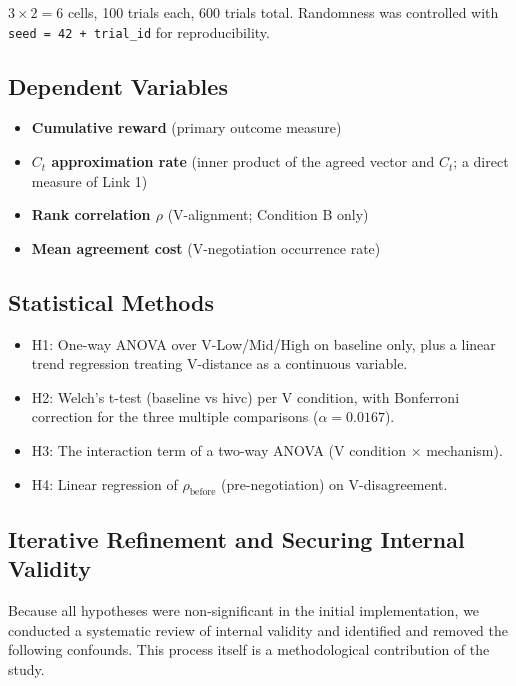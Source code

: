 \documentclass[11pt]{article}
\newcommand{\Ct}{\ensuremath{C_t}}
\begin{document}
$3\times2=6$ cells, 100 trials each, 600 trials total. Randomness was controlled with \texttt{seed = 42 + trial\_id} for reproducibility.

\subsection{Dependent Variables}

\begin{itemize}[nosep]
  \item \textbf{Cumulative reward} (primary outcome measure)
  \item \textbf{\Ct{} approximation rate} (inner product of the agreed vector and \Ct{}; a direct measure of Link 1)
  \item \textbf{Rank correlation $\rho$} (V-alignment; Condition B only)
  \item \textbf{Mean agreement cost} (V-negotiation occurrence rate)
\end{itemize}

\subsection{Statistical Methods}

\begin{itemize}[nosep]
  \item H1: One-way ANOVA over V-Low/Mid/High on baseline only, plus a linear trend regression treating V-distance as a continuous variable.
  \item H2: Welch's t-test (baseline vs hivc) per V condition, with Bonferroni correction for the three multiple comparisons ($\alpha=0.0167$).
  \item H3: The interaction term of a two-way ANOVA (V condition $\times$ mechanism).
  \item H4: Linear regression of $\rho_{\text{before}}$ (pre-negotiation) on V-disagreement.
\end{itemize}

\subsection{Iterative Refinement and Securing Internal Validity}

Because all hypotheses were non-significant in the initial implementation, we conducted a systematic review of internal validity and identified and removed the following confounds. This process itself is a methodological contribution of the study.
\end{document}
